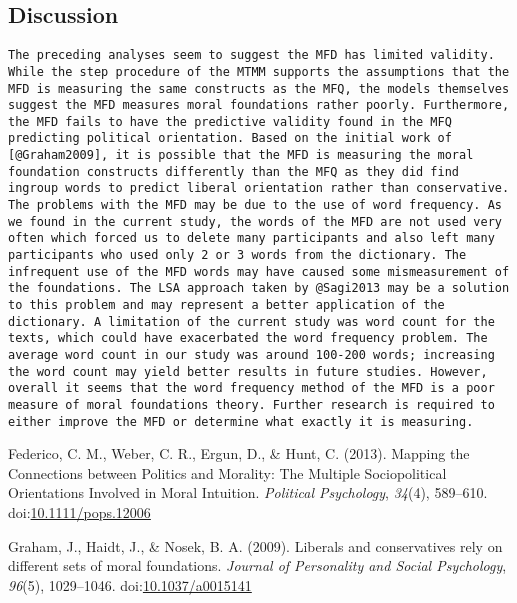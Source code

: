 \documentclass[english,man]{apa6}
\theoremstyle{definition}
\theoremstyle{definition}
\theoremstyle{definition}
\theoremstyle{remark}
\begin{document}
\subsection{Discussion}\label{discussion}

\begin{verbatim}
The preceding analyses seem to suggest the MFD has limited validity. While the step procedure of the MTMM supports the assumptions that the MFD is measuring the same constructs as the MFQ, the models themselves suggest the MFD measures moral foundations rather poorly. Furthermore, the MFD fails to have the predictive validity found in the MFQ predicting political orientation. Based on the initial work of [@Graham2009], it is possible that the MFD is measuring the moral foundation constructs differently than the MFQ as they did find ingroup words to predict liberal orientation rather than conservative. The problems with the MFD may be due to the use of word frequency. As we found in the current study, the words of the MFD are not used very often which forced us to delete many participants and also left many participants who used only 2 or 3 words from the dictionary. The infrequent use of the MFD words may have caused some mismeasurement of the foundations. The LSA approach taken by @Sagi2013 may be a solution to this problem and may represent a better application of the dictionary. A limitation of the current study was word count for the texts, which could have exacerbated the word frequency problem. The average word count in our study was around 100-200 words; increasing the word count may yield better results in future studies. However, overall it seems that the word frequency method of the MFD is a poor measure of moral foundations theory. Further research is required to either improve the MFD or determine what exactly it is measuring. 
\end{verbatim}

\hypertarget{refs}{}
\hypertarget{ref-Federico2013}{}
Federico, C. M., Weber, C. R., Ergun, D., \& Hunt, C. (2013). Mapping
the Connections between Politics and Morality: The Multiple
Sociopolitical Orientations Involved in Moral Intuition. \emph{Political
Psychology}, \emph{34}(4), 589--610.
doi:\href{https://doi.org/10.1111/pops.12006}{10.1111/pops.12006}

\hypertarget{ref-Graham2009}{}
Graham, J., Haidt, J., \& Nosek, B. A. (2009). Liberals and
conservatives rely on different sets of moral foundations. \emph{Journal
of Personality and Social Psychology}, \emph{96}(5), 1029--1046.
doi:\href{https://doi.org/10.1037/a0015141}{10.1037/a0015141}
\end{document}
